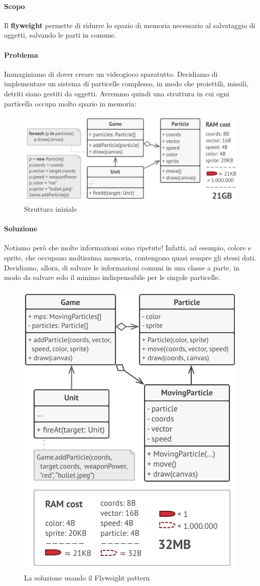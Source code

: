 \documentclass[11pt]{article}
\begin{document}
\paragraph{Scopo}
Il \textbf{flyweight} permette di ridurre lo spazio di memoria necessario al salvataggio di oggetti, salvando le parti in comune.  
\paragraph{Problema}
Immaginiamo di dover creare un videogioco sparatutto. Decidiamo di implementare un sistema di particelle complesso, in modo che proiettili, missili, detriti siano gestiti da oggetti. Avremmo quindi una struttura in cui ogni particella occupa molto spazio in memoria:
\begin{figure}[H]
    \centering
    \includegraphics[width=\linewidth]{res/teoria/FlyweightProblem.png}
    \caption{Struttura iniziale}
\end{figure}
\paragraph{Soluzione}
Notiamo però che molte informazioni sono ripetute! Infatti, ad esempio, colore e sprite, che occupano moltissima memoria, contengono quasi sempre gli stessi dati. Decidiamo, allora, di salvare le informazioni comuni in una classe a parte, in modo da salvare solo il minimo indispensabile per le singole particelle. 
\begin{figure}[H]
    \centering
    \includegraphics[width=0.6\linewidth]{res/teoria/FlyweightSolution.png}
    \caption{La soluzione usando il Flyweight pattern}
\end{figure}
\end{document}
